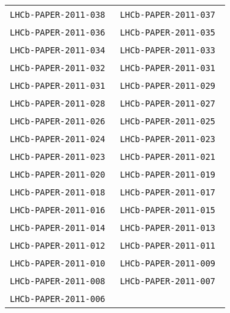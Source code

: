 \begin{center}
\begin{longtable}{ll}
\texttt{LHCb-PAPER-2011-038}~\cite{LHCb-PAPER-2011-038} &
\texttt{LHCb-PAPER-2011-037}~\cite{LHCb-PAPER-2011-037} \\
\texttt{LHCb-PAPER-2011-036}~\cite{LHCb-PAPER-2011-036} &
\texttt{LHCb-PAPER-2011-035}~\cite{LHCb-PAPER-2011-035} \\
\texttt{LHCb-PAPER-2011-034}~\cite{LHCb-PAPER-2011-034} &
\texttt{LHCb-PAPER-2011-033}~\cite{LHCb-PAPER-2011-033} \\
\texttt{LHCb-PAPER-2011-032}~\cite{LHCb-PAPER-2011-032} & 
\texttt{LHCb-PAPER-2011-031}~\cite{LHCb-PAPER-2011-031} \\
\texttt{LHCb-PAPER-2011-031}~\cite{LHCb-PAPER-2011-030} &
\texttt{LHCb-PAPER-2011-029}~\cite{LHCb-PAPER-2011-029} \\
\texttt{LHCb-PAPER-2011-028}~\cite{LHCb-PAPER-2011-028} &
\texttt{LHCb-PAPER-2011-027}~\cite{LHCb-PAPER-2011-027} \\
\texttt{LHCb-PAPER-2011-026}~\cite{LHCb-PAPER-2011-026} &
\texttt{LHCb-PAPER-2011-025}~\cite{LHCb-PAPER-2011-025} \\
\texttt{LHCb-PAPER-2011-024}~\cite{LHCb-PAPER-2011-024} &
\texttt{LHCb-PAPER-2011-023}~\cite{LHCb-PAPER-2011-023} \\
\texttt{LHCb-PAPER-2011-023}~\cite{LHCb-PAPER-2011-022} &
\texttt{LHCb-PAPER-2011-021}~\cite{LHCb-PAPER-2011-021} \\
\texttt{LHCb-PAPER-2011-020}~\cite{LHCb-PAPER-2011-020} &
\texttt{LHCb-PAPER-2011-019}~\cite{LHCb-PAPER-2011-019} \\
\texttt{LHCb-PAPER-2011-018}~\cite{LHCb-PAPER-2011-018} &
\texttt{LHCb-PAPER-2011-017}~\cite{LHCb-PAPER-2011-017} \\
\texttt{LHCb-PAPER-2011-016}~\cite{LHCb-PAPER-2011-016} &
\texttt{LHCb-PAPER-2011-015}~\cite{LHCb-PAPER-2011-015} \\
\texttt{LHCb-PAPER-2011-014}~\cite{LHCb-PAPER-2011-014} &
\texttt{LHCb-PAPER-2011-013}~\cite{LHCb-PAPER-2011-013} \\
\texttt{LHCb-PAPER-2011-012}~\cite{LHCb-PAPER-2011-012} &
\texttt{LHCb-PAPER-2011-011}~\cite{LHCb-PAPER-2011-011} \\
\texttt{LHCb-PAPER-2011-010}~\cite{LHCb-PAPER-2011-010} &
\texttt{LHCb-PAPER-2011-009}~\cite{LHCb-PAPER-2011-009} \\
\texttt{LHCb-PAPER-2011-008}~\cite{LHCb-PAPER-2011-008} &
\texttt{LHCb-PAPER-2011-007}~\cite{LHCb-PAPER-2011-007} \\
\texttt{LHCb-PAPER-2011-006}~\cite{LHCb-PAPER-2011-006} &

\end{longtable}
\end{center}
